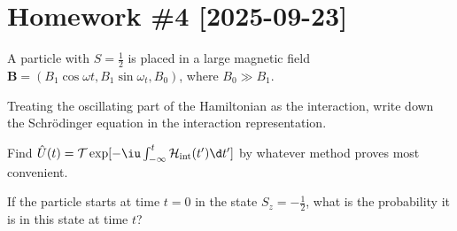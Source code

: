 
\section*{Homework \#4 [2025-09-23]}

\begin{problem}
  A particle with $S = \frac12$ is placed in a large magnetic field
  $\bm B = (B_1 \cos \omega t, B_1 \sin \omega_t, B_0)$,
  where $B_0 \gg B_1$.
  \begin{enumext}[label = (\alph*)]
    \item Treating the oscillating part of the Hamiltonian as the interaction,
    write down the Schr\"odinger equation in the interaction representation.
    \item Find $\hat U(t) = \mathcal T
    \exp[-\iu \int_{-\infty}^t \mathcal H_\text{int}(t') \d t']$
    by whatever method proves most convenient.
    \item If the particle starts at time $t = 0$ in the state
    $S_z = -\frac12$, what is the probability it is in this state at time $t$?
  \end{enumext}
\end{problem}
